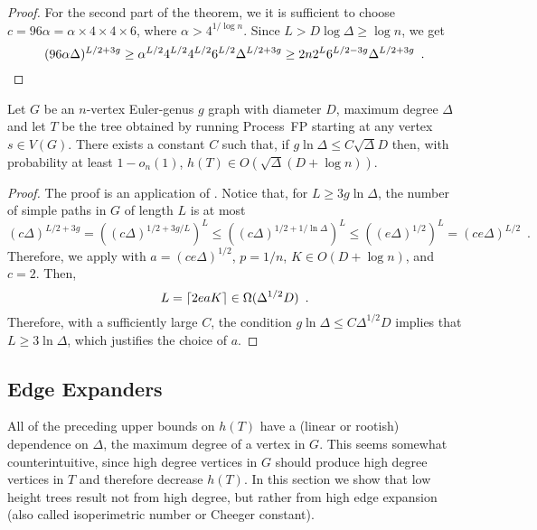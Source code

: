 \documentclass[lotsofwhite]{patmorin}
\begin{document}
\begin{proof}
   For the second part of the theorem, we it is sufficient to choose $c=96\alpha=\alpha\times 4\times4\times 6$, where $\alpha > 4^{1/\log n}$.  Since $L>D\log \Delta \ge \log n$, we get
   \[
       (96\alpha\Delta)^{L/2+3g} 
        \ge \alpha^{L/2} 4^{L/2}4^{L/2} 6^{L/2} \Delta^{L/2+3g}
        \ge 2 n 2^{L} 6^{L/2-3g} \Delta^{L/2+3g} \enspace . \qedhere
   \]
\end{proof}


\begin{thm}
  Let $G$ be an $n$-vertex Euler-genus $g$ graph with diameter $D$,
  maximum degree $\Delta$ and let $T$ be the tree obtained by running
  Process~FP starting at any vertex $s\in V(G)$.  There exists a constant
  $C$ such that, if $g\ln\Delta \le C\sqrt{\Delta}D$ then,
  with probability at least $1-o_n(1)$,
  $h(T)\in O(\sqrt{\Delta}(D+\log n))$.
\end{thm}

\begin{proof}
  The proof is an application of .  Notice that,
  for $L\ge 3g\ln\Delta$, the number of simple paths in $G$ of length
  $L$ is at most
  \[
     (c\Delta)^{L/2+3g} 
        = \left((c\Delta)^{1/2+3g/L}\right)^L
        \le \left((c\Delta)^{1/2+1/\ln\Delta}\right)^L
        \le \left((e\Delta)^{1/2}\right)^L
        = (ce\Delta)^{L/2} \enspace .
  \]
  Therefore, we apply  with $a=(ce\Delta)^{1/2}$,
  $p=1/n$, $K\in O(D+\log n)$, and $c=2$.  Then,
  \[
      L={\lceil 2eaK \rceil} \in \Omega(\Delta^{1/2}D) \enspace .
  \]
  Therefore, with a sufficiently large $C$, the condition $g\ln\Delta \le C\Delta^{1/2}D$ implies that $L\ge 3\ln\Delta$, which justifies the choice of $a$.
\end{proof}

\subsection{Edge Expanders}

All of the preceding upper bounds on $h(T)$ have a (linear or rootish)
dependence on $\Delta$, the maximum degree of a vertex in $G$.
This seems somewhat counterintuitive, since high degree vertices in $G$
should produce high degree vertices in $T$ and therefore decrease $h(T)$.
In this section we show that low height trees result not from high degree,
but rather from high edge expansion (also called isoperimetric number
or Cheeger constant).
\end{document}

